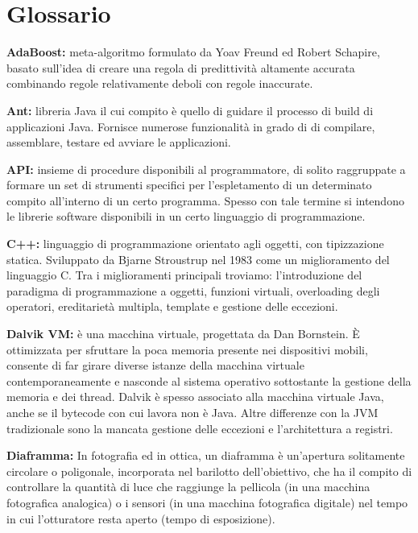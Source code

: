 \newpage
\newpage
\chapter{Glossario} %
\label{AppendixA} %



\textbf{AdaBoost:} meta-algoritmo formulato da Yoav Freund ed Robert Schapire, basato sull'idea di creare una regola di predittività altamente accurata combinando regole relativamente deboli con regole inaccurate.

\textbf{Ant:} libreria Java il cui compito è quello di guidare il processo di build di applicazioni Java. Fornisce numerose funzionalità in grado di di compilare, assemblare, testare ed avviare le applicazioni.

\textbf{API:} insieme di procedure disponibili al programmatore, di solito raggruppate a formare un set di strumenti specifici per l'espletamento di un determinato compito all'interno di un certo programma. Spesso con tale termine si intendono le librerie software disponibili in un certo linguaggio di programmazione.

\textbf{C++:} linguaggio di programmazione orientato agli oggetti, con tipizzazione statica. Sviluppato da Bjarne Stroustrup nel 1983 come un miglioramento del linguaggio C. Tra i miglioramenti principali troviamo: l'introduzione del paradigma di programmazione a oggetti, funzioni virtuali, overloading degli operatori, ereditarietà multipla, template e gestione delle eccezioni.

\textbf{Dalvik VM:} è una macchina virtuale, progettata da Dan Bornstein. È ottimizzata per sfruttare la poca memoria presente nei dispositivi mobili, consente di far girare diverse istanze della macchina virtuale contemporaneamente e nasconde al sistema operativo sottostante la gestione della memoria e dei thread. Dalvik è spesso associato alla macchina virtuale Java, anche se il bytecode con cui lavora non è Java. Altre differenze con la JVM tradizionale sono la mancata gestione delle eccezioni e l'architettura a registri.

\textbf{Diaframma:} In fotografia ed in ottica, un diaframma è un'apertura solitamente circolare o poligonale, incorporata nel barilotto dell'obiettivo, che ha il compito di controllare la quantità di luce che raggiunge la pellicola (in una macchina fotografica analogica) o i sensori (in una macchina fotografica digitale) nel tempo in cui l'otturatore resta aperto (tempo di esposizione).

